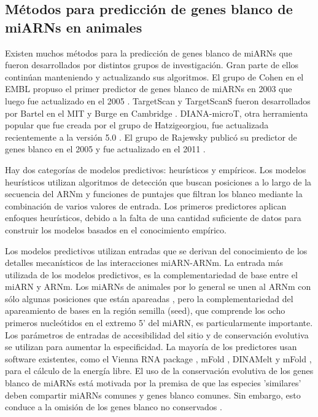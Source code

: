 \subsection{Métodos para predicción de genes blanco de miARNs en animales}
Existen muchos métodos para la predicción de genes blanco de miARNs que fueron desarrollados por distintos grupos de investigación.
Gran parte de ellos continúan manteniendo y actualizando sus algoritmos. El grupo de Cohen en el EMBL propuso el primer predictor de genes blanco de miARNs en 2003 \citep{pmid14691535} que luego fue actualizado en el 2005 \citep{pmid16337999}.
TargetScan y TargetScanS fueron desarrollados por Bartel en el MIT y Burge en Cambridge \citep{pmid18955434,pmid17612493,pmid14697198,pmid15652477}.
DIANA-microT, otra herramienta popular que fue creada por el grupo de Hatzigeorgiou, fue actualizada recientemente a la versión 5.0 \citep{pmid19765283,pmid21551220,pmid23680784}.
El grupo de Rajewsky publicó su predictor de genes blanco en el 2005 y fue actualizado en el 2011 \citep{pmid15383676,pmid22086949}. 

Hay dos categorías de modelos predictivos: heurísticos y empíricos.
Los modelos heurísticos utilizan algoritmos de detección que buscan posiciones a lo largo de la secuencia del ARNm y funciones de puntajes que filtran los blanco mediante la combinación de varios valores de entrada.
Los primeros predictores aplican enfoques heurísticos, debido a la falta de una cantidad suficiente de datos para construir los modelos basados en el conocimiento empírico.

Los modelos predictivos utilizan entradas que se derivan del conocimiento de los detalles mecanísticos de las interacciones miARN-ARNm.
La entrada  más utilizada de los modelos predictivos, es la complementariedad de base entre el miARN y ARNm.
Los miARNs de animales por lo general se unen al ARNm con sólo algunas posiciones que están apareadas \citep{pmid15345038}, pero la complementariedad del apareamiento de bases en la región semilla (seed), que comprende los ocho primeros nucleótidos en el extremo 5' del miARN, es particularmente importante.
Los parámetros de entradas de accesibilidad del sitio y de conservación evolutiva se utilizan para aumentar la especificidad.
La mayoría de los predictores usan software existentes, como el Vienna RNA package \citep{pmid22115189}, mFold \citep{pmid12824337}, DINAMelt \citep{pmid15980540} y mFold \citep{pmid15215366}, para el cálculo de la energía libre.
El uso de la conservación evolutiva de los genes blanco de miARNs está motivada por la premisa de que las especies 'similares' deben compartir miARNs comunes y genes blanco comunes.
Sin embargo, esto conduce a la omisión de los genes blanco no conservados \citep{pmid17254305, pmid21674004}.



